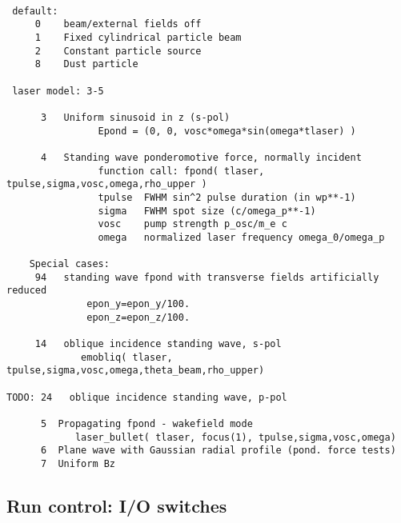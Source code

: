\documentclass[11pt,psfig]{article}
\begin{document}
\begin{verbatim}

 default:  
     0    beam/external fields off
     1    Fixed cylindrical particle beam
     2    Constant particle source
     8    Dust particle

 laser model: 3-5

      3   Uniform sinusoid in z (s-pol)
                Epond = (0, 0, vosc*omega*sin(omega*tlaser) )

      4   Standing wave ponderomotive force, normally incident
                function call: fpond( tlaser, tpulse,sigma,vosc,omega,rho_upper )
                tpulse  FWHM sin^2 pulse duration (in wp**-1)
                sigma   FWHM spot size (c/omega_p**-1)
                vosc    pump strength p_osc/m_e c
                omega   normalized laser frequency omega_0/omega_p
 
    Special cases:
     94   standing wave fpond with transverse fields artificially reduced
              epon_y=epon_y/100.
              epon_z=epon_z/100.

     14   oblique incidence standing wave, s-pol
             emobliq( tlaser, tpulse,sigma,vosc,omega,theta_beam,rho_upper)

TODO: 24   oblique incidence standing wave, p-pol

      5  Propagating fpond - wakefield mode
            laser_bullet( tlaser, focus(1), tpulse,sigma,vosc,omega)
      6  Plane wave with Gaussian radial profile (pond. force tests)
      7  Uniform Bz

\end{verbatim}

\subsection{Run control: I/O switches}
\end{document}
